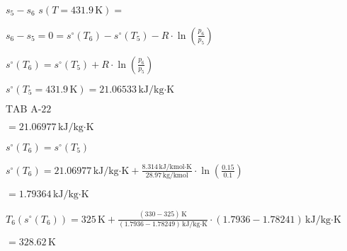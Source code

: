\( s_5 - s_6 \)  
\( s(T = 431.9 \, \text{K}) = \)  

\( s_6 - s_5 = 0 = s^\circ(T_6) - s^\circ(T_5) - R \cdot \ln\left(\frac{p_6}{p_5}\right) \)  

\( s^\circ(T_6) = s^\circ(T_5) + R \cdot \ln\left(\frac{p_6}{p_5}\right) \)  

\( s^\circ(T_5 = 431.9 \, \text{K}) = 21.06533 \, \text{kJ/kg·K} \)  

\( \text{TAB A-22} \)  

\( = 21.06977 \, \text{kJ/kg·K} \)  

\( s^\circ(T_6) = s^\circ(T_5) \)  

\( s^\circ(T_6) = 21.06977 \, \text{kJ/kg·K} + \frac{8.314 \, \text{kJ/kmol·K}}{28.97 \, \text{kg/kmol}} \cdot \ln\left(\frac{0.15}{0.1}\right) \)  

\( = 1.79364 \, \text{kJ/kg·K} \)  

\( T_6(s^\circ(T_6)) = 325 \, \text{K} + \frac{(330 - 325) \, \text{K}}{(1.7936 - 1.78249) \, \text{kJ/kg·K}} \cdot (1.7936 - 1.78241) \, \text{kJ/kg·K} \)  

\( = 328.62 \, \text{K} \)